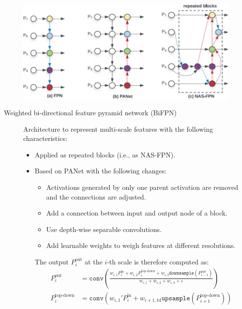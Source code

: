 \begin{subappendices}
\begin{description}
\begin{remark}
                    \begin{figure}[H]
                        \centering
                        \includegraphics[width=0.65\linewidth]{./img/multiscale_comparison.jpg}
                    \end{figure}
                \end{remark}

                \begin{description}
                    \item[Weighted bi-directional feature pyramid network (BiFPN)] 
                        Architecture to represent multi-scale features with the following characteristics:
                        \begin{itemize}
                            \item Applied as repeated blocks (i.e., as NAS-FPN).
                            \item Based on PANet with the following changes:
                            \begin{itemize}
                                \item Activations generated by only one parent activation are removed and the connections are adjusted.
                                \item Add a connection between input and output node of a block.
                                \item Use depth-wise separable convolutions.
                                \item Add learnable weights to weigh features at different resolutions. 
                            \end{itemize}
                            The output $P_i^\text{out}$ at the $i$-th scale is therefore computed as:
                            \[ 
                                \begin{split}
                                    P_i^\text{out} &= \texttt{conv}\left( \frac{w_{i, 1} P_i^\text{in} + w_{i, 2} P_i^\text{top-down} + w_{i, 3} \texttt{downsample}(P_{i-1}^\text{out})}{w_{i, 1} + w_{i, 2} + w_{i, 3} + \varepsilon} \right) \\
                                    P_i^\text{top-down} &= \texttt{conv}\left( w_{i, 1}' P_i^\text{in} + w_{i+1, \text{td}} \texttt{upsample}(P_{i+1}^\text{top-down}) \right)
                                \end{split}
                            \]


\end{itemize}
\end{description}
\end{description}
\end{subappendices}
